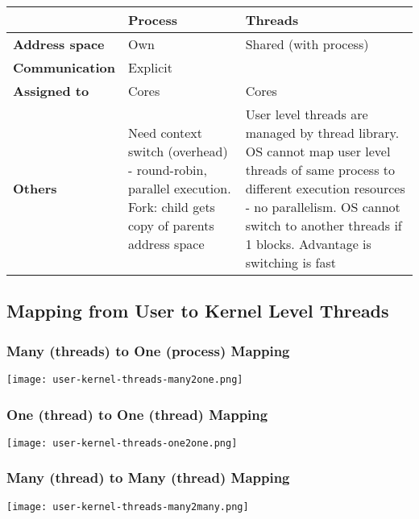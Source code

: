 \documentclass[12pt]{article}
\begin{document}
\begin{spacing}{1.5}
\begin{tabular}{l | p{6cm} p{6cm}}
& \textbf{Process} & \textbf{Threads} \\
\hline
\textbf{Address space} & Own & Shared (with process) \\
\textbf{Communication} & Explicit &  \\
\textbf{Assigned to} & Cores & Cores \\
\textbf{Others} & Need context switch (overhead) - round-robin, parallel execution. Fork: child gets copy of parents address space & User level threads are managed by thread library. OS cannot map user level threads of same process to different execution resources - no parallelism. OS cannot switch to another threads if 1 blocks. Advantage is switching is fast
\end{tabular}

\subsection{Mapping from User to Kernel Level Threads}

\subsubsection{Many (threads) to One (process) Mapping}

\texttt{[image: user-kernel-threads-many2one.png]}

\subsubsection{One (thread) to One (thread) Mapping}

\texttt{[image: user-kernel-threads-one2one.png]}

\subsubsection{Many (thread) to Many (thread) Mapping}

\texttt{[image: user-kernel-threads-many2many.png]}


\end{spacing}
\end{document}
